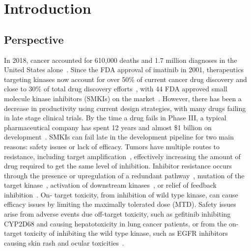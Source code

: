 \documentclass[phd,tocprelim]{cornell}
\DeclareRobustCommand{\gobblefive}[5]{}
\newcommand*{\SkipTocEntry}{\addtocontents{toc}{\gobblefive}}
\begin{document}
\SkipTocEntry\contentspage
\tablelistpage
\figurelistpage


\normalspacing \setcounter{page}{1} 
\pagestyle{cornell} \addtolength{\parskip}{0.5\baselineskip}

\chapter{Introduction}

\section{Perspective}
In 2018, cancer accounted for 610,000 deaths and 1.7 million diagnoses in the United States alone~\citep{Siegel:2018cq}. Since the FDA approval of imatinib in 2001, therapeutics targeting kinases now account for over 50\% of current cancer drug discovery and close to 30\% of total drug discovery efforts~\citep{Cohen:2010fs}, with 44 FDA approved small molecule kinase inhibitors (SMKIs) on the market~\citep{fda-approved-kinase-inhibitors}. However, there has been a decrease in productivity using current design strategies, with many drugs failing in late stage clinical trials. By the time a drug fails in Phase III, a typical pharmaceutical company has spent 12 years and almost \$1 billion on development~\citep{Paul:2010ff}. SMKIs can fail late in the development pipeline for two main reasons: safety issues or lack of efficacy. Tumors have multiple routes to resistance, including target amplification~\citep{SanchezVega:2018jg,Bose:2013gl}, effectively increasing the amount of drug required to get the same level of inhibition. Inhibitor resistance occurs through the presence or upregulation of a redundant pathway~\citep{Prahallad:2012iw,Engelman:2007ka}, mutation of the target kinase~\citep{Pao:2005dp,Drilon:2017gb}, activation of downstream kinases~\citep{Knight:Nat.Rev.Cancer:2010}, or relief of feedback inhibition~\citep{Chandarlapaty:CancerCell:2011}. On- target toxicity, from inhibition of wild type kinase, can cause efficacy issues by limiting the maximally tolerated dose (MTD). Safety issues arise from adverse events due off-target toxicity, such as gefitinib inhibiting CYP2D68 and causing hepatotoxicity in lung cancer patients, or from the on-target toxicity of inhibiting the wild type kinase, such as EGFR inhibitors causing skin rash and ocular toxicities~\citep{Rudmann2013-hi,Liu2014-yi}.
\end{document}
